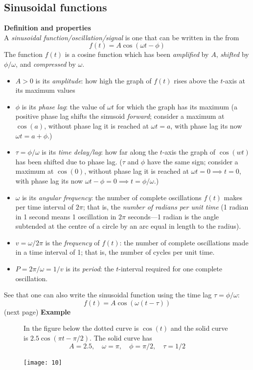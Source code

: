 \documentclass{report}
\begin{document}
\subsection{Sinusoidal functions}
\textbf{Definition and properties}\\
A \textit{sinusoidal function/oscillation/signal} is one
that can be written in the from
\begin{equation*}
f(t)=A\cos(\omega t-\phi)
\end{equation*}
The function $f(t)$ is a cosine function which has been 
\textit{amplified} by $A$, \textit{shifted} by $\phi/\omega$, and \textit{compressed} by $\omega$.
\begin{itemize}
\item$A>0$ is its \textit{amplitude}: how high the graph of $f(t)$ rises above the $t$-axis at its maximum values
\item$\phi$ is its \textit{phase lag}: the value of $\omega t$ for which the graph has its maximum 
(a positive phase lag shifts the sinusoid \textit{forward}; consider a maximum at $\cos(a)$, 
without phase lag it is reached at $\omega t=a$, with phase lag its now $\omega t=a+\phi$.)
\item$\tau=\phi/\omega$ is its \textit{time delay/lag}: how far along the $t$-axis the graph of $\cos(wt)$ has been 
shifted due to phase lag. ($\tau$ and $\phi$ have the same sign; consider a maximum at $\cos(0)$, without
phase lag it is reached at $\omega t=0\implies t=0$, with phase lag its now 
$\omega t-\phi=0\implies t=\phi/\omega$.)
\item$\omega$ is its \textit{angular frequency}: the number of complete oscillations $f(t)$ makes per time interval
of $2\pi$; that is, the \textit{number of radians per unit time} 
(1 radian in 1 second means 1 oscillation in $2\pi$ seconds---1 radian is the angle subtended at the centre of 
a circle by an arc equal in length to the radius).
\item$v=\omega/2\pi$ is the \textit{frequency} of $f(t)$: the number of complete oscillations made in a
time interval of 1; that is, the number of cycles per unit time.
\item$P=2\pi/\omega=1/v$ is its \textit{period}: the $t$-interval required for one complete oscillation.
\end{itemize}
See that one can also write the sinusoidal function using
the time lag $\tau=\phi/\omega$:
\begin{equation*}
f(t)=A\cos(\omega(t-\tau))
\end{equation*}
(next page)
\newpage
\noindent\textbf{Example}\\
\begin{figure}[h]
In the figure below the dotted curve is $\cos(t)$ and the solid curve is $2.5\cos(\pi t-\pi/2)$. The solid
curve has
\begin{equation*}
A=2.5,\quad\omega=\pi,\quad\phi=\pi/2,\quad\tau=1/2
\end{equation*}
\begin{center}
\texttt{[image: 10]}\\
\end{center}
\end{figure}
\newpage
\end{document}
